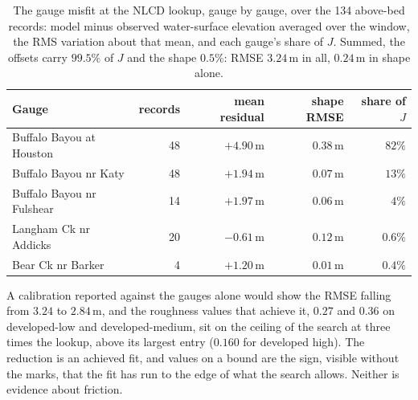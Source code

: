 \documentclass[11pt]{article}
\begin{document}
\begin{table}
\centering\small
\begin{tabular}{@{}lrrrr@{}}
\toprule
Gauge & records & mean residual & shape RMSE & share of $J$ \\
\midrule
Buffalo Bayou at Houston & 48 & $+4.90$\,m & $0.38$\,m & $82\%$ \\
Buffalo Bayou nr Katy & 48 & $+1.94$\,m & $0.07$\,m & $13\%$ \\
Buffalo Bayou nr Fulshear & 14 & $+1.97$\,m & $0.06$\,m & $4\%$ \\
Langham Ck nr Addicks & 20 & $-0.61$\,m & $0.12$\,m & $0.6\%$ \\
Bear Ck nr Barker & 4 & $+1.20$\,m & $0.01$\,m & $0.4\%$ \\
\bottomrule
\end{tabular}
\caption{The gauge misfit at the NLCD lookup, gauge by gauge, over the
134 above-bed records: model minus observed water-surface elevation
averaged over the window, the RMS variation about that mean, and each
gauge's share of $J$. Summed, the offsets carry $99.5\%$ of $J$ and
the shape $0.5\%$: RMSE $3.24$\,m in all, $0.24$\,m in shape alone.}
\label{tab:gaugeresid}
\end{table}

A calibration reported against the gauges alone would show the RMSE
falling from $3.24$ to $2.84$\,m, and the roughness values that
achieve it, $0.27$ and $0.36$ on developed-low and developed-medium,
sit on the ceiling of the search at three times the lookup, above its
largest entry ($0.160$ for developed high). The reduction is an
achieved fit, and values on a bound are the sign, visible without the
marks, that the fit has run to the edge of what the search allows.
Neither is evidence about friction.
\end{document}
